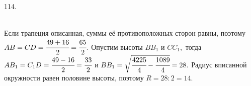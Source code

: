 114. \begin{figure}[ht!]
\end{figure}\\
Если трапеция описанная, суммы её противоположных сторон равны, поэтому\\ $AB=CD=\cfrac{49+16}{2}=\cfrac{65}{2}.$ Опустим высоты $BB_1$ и $CC_1,$ тогда $AB_1=C_1D=\cfrac{49-16}{2}=\cfrac{33}{2}$ и $BB_1=\sqrt{\cfrac{4225}{4}-\cfrac{1089}{4}}=28.$ Радиус вписанной окружности равен половине высоты, поэтому $R=28:2=14.$\\
